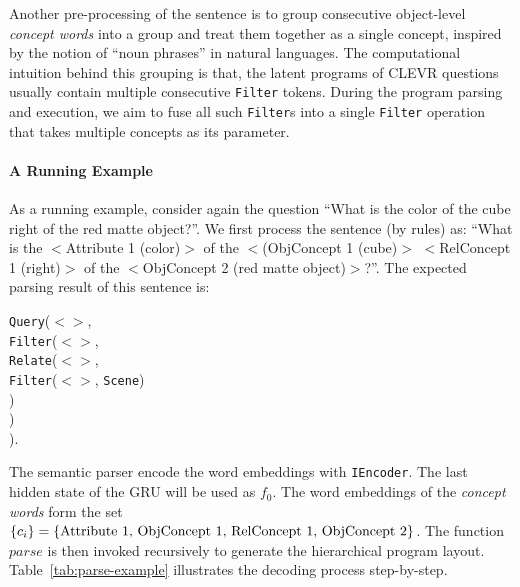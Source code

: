 \documentclass{article} %
\newcommand{\tbl}[1]{Table~\ref{#1}}
\begin{document}
Another pre-processing of the sentence is to group consecutive object-level {\it concept words} into a group and treat them together as a single concept, inspired by the notion of ``noun phrases'' in natural languages. The computational intuition behind this grouping is that, the latent programs of CLEVR questions usually contain multiple consecutive \texttt{Filter} tokens. During the program parsing and execution, we aim to fuse all such \texttt{Filter}s into a single \texttt{Filter} operation that takes multiple concepts as its parameter.

\paragraph{A Running Example}
As a running example, consider again the question ``What is the color of the cube right of the red matte object?''. We first process the sentence (by rules) as:
``What is the $<$Attribute 1 (color)$>$ of the $<$(ObjConcept 1 (cube)$>$ $<$RelConcept 1 (right)$>$ of the  $<$ObjConcept 2 (red matte object)$>$?''. The expected parsing result of this sentence is:

\begin{adjustwidth}{4em}{0em}
\texttt{Query}($<$$>$,\\
\hspace*{1cm} \texttt{Filter}($<$$>$,\\
\hspace*{2cm} \texttt{Relate}($<$$>$,\\
\hspace*{3cm} \texttt{Filter}($<$$>$, \texttt{Scene})\\
\hspace*{2cm})\\
\hspace*{1cm})\\
).
\end{adjustwidth}

The semantic parser encode the word embeddings with {\tt IEncoder}. The last hidden state of the GRU will be used as $f_0$. The word embeddings of the {\it concept words} form the set $\{c_i\} = \{\textnormal{Attribute 1, ObjConcept 1, RelConcept 1, ObjConcept 2}\}$. The function $parse$ is then invoked recursively to generate the hierarchical program layout. \tbl{tab:parse-example} illustrates the decoding process step-by-step.
\end{document}
